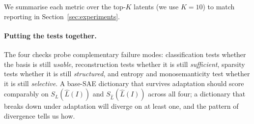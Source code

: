 We summarise each metric over the top-$K$ latents (we use $K = 10$) to
match reporting in Section~\ref{sec:experiments}.

\paragraph{Putting the tests together.}
The four checks probe complementary failure modes: classification tests
whether the basis is still \emph{usable}, reconstruction tests whether it
is still \emph{sufficient}, sparsity tests whether it is still
\emph{structured}, and entropy and monosemanticity test whether it is
still \emph{selective}. A base-SAE dictionary that survives adaptation
should score comparably on $S_L(\hat{L}(I))$ and $S_{\hat{L}}(\hat{L}(I))$
across all four; a dictionary that breaks down under adaptation will
diverge on at least one, and the pattern of divergence tells us how.